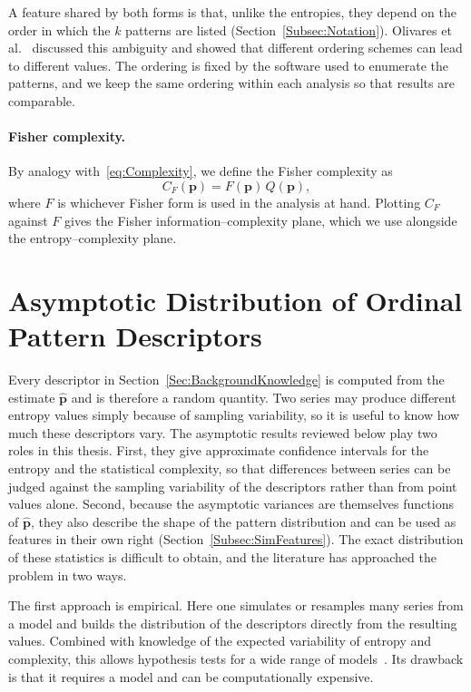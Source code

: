 A feature shared by both forms is that, unlike the entropies, they depend on the order in which the $k$ patterns are listed (Section~\ref{Subsec:Notation}). Olivares et al.~\cite{Olivares2012b} discussed this ambiguity and showed that different ordering schemes can lead to different values. The ordering is fixed by the software used to enumerate the patterns, and we keep the same ordering within each analysis so that results are comparable.

\paragraph{Fisher complexity.} By analogy with~\eqref{eq:Complexity}, we define the Fisher complexity as
\begin{equation}
	C_F(\mathbf{p})=F(\mathbf{p})\,Q(\mathbf{p}),
	\label{eq:FisherComplexity}
\end{equation}
where $F$ is whichever Fisher form is used in the analysis at hand. Plotting $C_F$ against $F$ gives the Fisher information--complexity plane, which we use alongside the entropy--complexity plane.


\section{Asymptotic Distribution of Ordinal Pattern Descriptors}\label{Sec:AsymptoticDistribution}

Every descriptor in Section~\ref{Sec:BackgroundKnowledge} is computed from the estimate $\widehat{\mathbf{p}}$ and is therefore a random quantity. Two series may produce different entropy values simply because of sampling variability, so it is useful to know how much these descriptors vary. The asymptotic results reviewed below play two roles in this thesis. First, they give approximate confidence intervals for the entropy and the statistical complexity, so that differences between series can be judged against the sampling variability of the descriptors rather than from point values alone. Second, because the asymptotic variances are themselves functions of $\widehat{\mathbf{p}}$, they also describe the shape of the pattern distribution and can be used as features in their own right (Section~\ref{Subsec:SimFeatures}). The exact distribution of these statistics is difficult to obtain, and the literature has approached the problem in two ways.

The first approach is empirical. Here one simulates or resamples many series from a model and builds the distribution of the descriptors directly from the resulting values. Combined with knowledge of the expected variability of entropy and complexity, this allows hypothesis tests for a wide range of models~\cite{Chagas2022a,DeMicco2008,Larrondo2005,Larrondo2006}. Its drawback is that it requires a model and can be computationally expensive.


